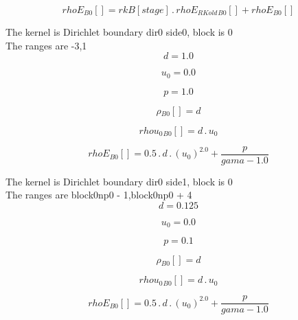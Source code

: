\documentclass{article}
\begin{document}
\begin{dmath}{rhoE{_{B0}}}[{}] = {rkB}[{stage}] \,.\, {rhoE_{RKold}{_{B0}}}[{}] + {rhoE{_{B0}}}[{}]\end{dmath}

\noindent The kernel is Dirichlet boundary dir0 side0, block is 0\\\noindent The ranges are -3,1\\\begin{dmath}d = 1.0\end{dmath}

\begin{dmath}u_{0} = 0.0\end{dmath}

\begin{dmath}p = 1.0\end{dmath}

\begin{dmath}{\rho{_{B0}}}[{}] = d\end{dmath}

\begin{dmath}{rhou_{0}{_{B0}}}[{}] = d \,.\, u_{0}\end{dmath}

\begin{dmath}{rhoE{_{B0}}}[{}] = 0.5 \,.\, d \,.\, \left(u_{0} \right)^{2.0} + \frac{p}{gama - 1.0}\end{dmath}

\noindent The kernel is Dirichlet boundary dir0 side1, block is 0\\\noindent The ranges are block0np0 - 1,block0np0 + 4\\\begin{dmath}d = 0.125\end{dmath}

\begin{dmath}u_{0} = 0.0\end{dmath}

\begin{dmath}p = 0.1\end{dmath}

\begin{dmath}{\rho{_{B0}}}[{}] = d\end{dmath}

\begin{dmath}{rhou_{0}{_{B0}}}[{}] = d \,.\, u_{0}\end{dmath}

\begin{dmath}{rhoE{_{B0}}}[{}] = 0.5 \,.\, d \,.\, \left(u_{0} \right)^{2.0} + \frac{p}{gama - 1.0}\end{dmath}
\end{document}
